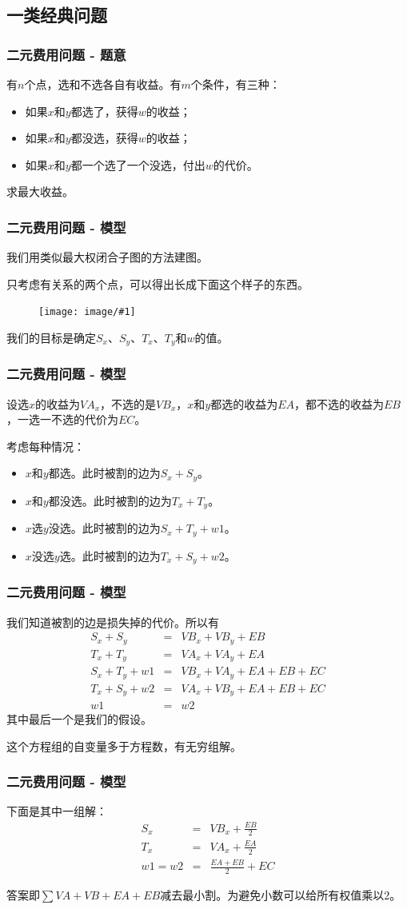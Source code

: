 \documentclass[9pt,dvipsnames,table]{beamer}
\newcommand{\graph}[2]
{\begin{figure}[h]
	\centering
	\texttt{[image: image/\#1]}
\end{figure}}
\begin{document}
\subsection{一类经典问题}
\begin{frame}
	\frametitle{二元费用问题 - 题意}
	有$n$个点，选和不选各自有收益。有$m$个条件，有三种：
	\begin{itemize}
		\item 如果$x$和$y$都选了，获得$w$的收益；
		\item 如果$x$和$y$都没选，获得$w$的收益；
		\item 如果$x$和$y$都一个选了一个没选，付出$w$的代价。
	\end{itemize}
	
	求最大收益。
\end{frame}
\begin{frame}
	\frametitle{二元费用问题 - 模型}
	我们用类似最大权闭合子图的方法建图。
	
	只考虑有关系的两个点，可以得出长成下面这个样子的东西。
	
	\graph{cost.png}{0.5}
	
	我们的目标是确定$S_x$、$S_y$、$T_x$、$T_y$和$w$的值。
\end{frame}
\begin{frame}
	\frametitle{二元费用问题 - 模型}
	设选$x$的收益为$VA_x$，不选的是$VB_x$，$x$和$y$都选的收益为$EA$，都不选的收益为$EB$，一选一不选的代价为$EC$。\pause
	
	考虑每种情况：
	\begin{itemize}
		\item $x$和$y$都选。此时被割的边为$S_x+S_y$。
		\item $x$和$y$都没选。此时被割的边为$T_x+T_y$。
		\item $x$选$y$没选。此时被割的边为$S_x+T_y+w1$。
		\item $x$没选$y$选。此时被割的边为$T_x+S_y+w2$。
	\end{itemize}
\end{frame}
\begin{frame}
	\frametitle{二元费用问题 - 模型}
	我们知道被割的边是损失掉的代价。所以有
	\begin{eqnarray*}
		S_x+S_y & = & VB_x+VB_y+EB \\
		T_x+T_y & = & VA_x+VA_y+EA \\
		S_x+T_y+w1 & = & VB_x+VA_y+EA+EB+EC \\
		T_x+S_y+w2 & = & VA_x+VB_y+EA+EB+EC \\
		w1 & = & w2
	\end{eqnarray*}
	其中最后一个是我们的假设。\pause

	这个方程组的自变量多于方程数，有无穷组解。
\end{frame}
\begin{frame}
	\frametitle{二元费用问题 - 模型}
	下面是其中一组解：
	\begin{eqnarray*}
		S_x & = & VB_x+\frac{EB}{2} \\
		T_x & = & VA_x+\frac{EA}{2} \\
		w1=w2 & = & \frac{EA+EB}{2}+EC
	\end{eqnarray*}
	
	答案即$\sum{VA+VB+EA+EB}$减去最小割。为避免小数可以给所有权值乘以2。
\end{frame}
\end{document}
